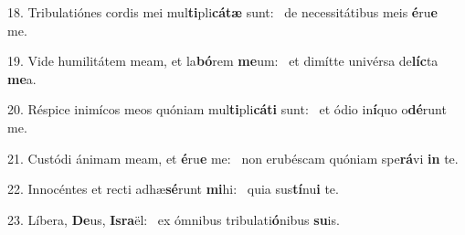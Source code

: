 18. Tribulatiónes cordis mei mul\textbf{ti}pli\textbf{cá}\textbf{tæ} sunt: \ast\  de necessitátibus meis \textbf{é}ru\textbf{e} me.\

19. Vide humilitátem meam, et la\textbf{bó}rem \textbf{me}um: \ast\  et dimítte univérsa de\textbf{líc}ta \textbf{me}a.\

20. Réspice inimícos meos quóniam mul\textbf{ti}pli\textbf{cá}\textbf{ti} sunt: \ast\  et ódio in\textbf{í}quo o\textbf{dé}runt me.\

21. Custódi ánimam meam, et \textbf{é}ru\textbf{e} me: \ast\  non erubéscam quóniam spe\textbf{rá}vi \textbf{in} te.\

22. Innocéntes et recti adhæ\textbf{sé}runt \textbf{mi}hi: \ast\  quia sus\textbf{tí}nu\textbf{i} te.\

23. Líbera, \textbf{De}us, \textbf{Is}\textbf{ra}ël: \ast\  ex ómnibus tribulati\textbf{ó}nibus \textbf{su}is.\

